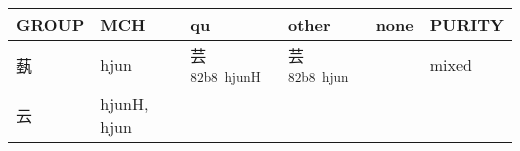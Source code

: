 \documentclass[14pt,a4paper]{scrartcl}
\begin{document}
\begin{longtable}[c]{@{}llllll@{}}
\toprule
\begin{minipage}[b]{0.14\columnwidth}\raggedright\strut
GROUP
\strut\end{minipage} &
\begin{minipage}[b]{0.14\columnwidth}\raggedright\strut
MCH
\strut\end{minipage} &
\begin{minipage}[b]{0.14\columnwidth}\raggedright\strut
qu
\strut\end{minipage} &
\begin{minipage}[b]{0.14\columnwidth}\raggedright\strut
other
\strut\end{minipage} &
\begin{minipage}[b]{0.14\columnwidth}\raggedright\strut
none
\strut\end{minipage} &
\begin{minipage}[b]{0.14\columnwidth}\raggedright\strut
PURITY
\strut\end{minipage}\tabularnewline
\midrule
\endhead
\begin{minipage}[t]{0.14\columnwidth}\raggedright\strut
蓺
\strut\end{minipage} &
\begin{minipage}[t]{0.14\columnwidth}\raggedright\strut
hjun
\strut\end{minipage} &
\begin{minipage}[t]{0.14\columnwidth}\raggedright\strut
芸\textsuperscript{82b8~hjunH}
\strut\end{minipage} &
\begin{minipage}[t]{0.14\columnwidth}\raggedright\strut
芸\textsuperscript{82b8~hjun}
\strut\end{minipage} &
\begin{minipage}[t]{0.14\columnwidth}\raggedright\strut
\strut\end{minipage} &
\begin{minipage}[t]{0.14\columnwidth}\raggedright\strut
mixed
\strut\end{minipage}\tabularnewline
\begin{minipage}[t]{0.14\columnwidth}\raggedright\strut
云
\strut\end{minipage} &
\begin{minipage}[t]{0.14\columnwidth}\raggedright\strut
hjunH, hjun
\strut\end{minipage} &
\begin{minipage}[t]{0.14\columnwidth}\raggedright\strut
\strut\end{minipage} &

\end{longtable}
\end{document}
